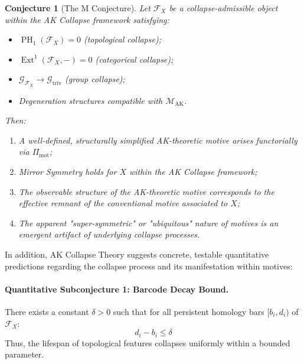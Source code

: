 \documentclass[11pt]{article}
\newtheorem{conjecture}{Conjecture}[section]
\DeclareMathOperator{\Ext}{Ext}
\DeclareMathOperator{\PH}{PH}
\begin{document}
\begin{conjecture}[The M Conjecture]
Let $\mathcal{F}_X$ be a collapse-admissible object within the AK Collapse framework satisfying:

\begin{itemize}
    \item $\PH_1(\mathcal{F}_X) = 0$ (topological collapse);
    \item $\Ext^1(\mathcal{F}_X, -) = 0$ (categorical collapse);
    \item $\mathcal{G}_{\mathcal{F}_X} \longrightarrow \mathcal{G}_{\mathrm{triv}}$ (group collapse);
    \item Degeneration structures compatible with $\mathcal{M}_{\mathrm{AK}}$.
\end{itemize}

Then:

\begin{enumerate}
    \item A well-defined, structurally simplified AK-theoretic motive arises functorially via $\Pi_{\mathrm{mot}}$;
    \item Mirror Symmetry holds for $X$ within the AK Collapse framework;
    \item The observable structure of the AK-theoretic motive corresponds to the effective remnant of the conventional motive associated to $X$;
    \item The apparent "super-symmetric" or "ubiquitous" nature of motives is an emergent artifact of underlying collapse processes.
\end{enumerate}
\end{conjecture}

\vspace{1em}

In addition, AK Collapse Theory suggests concrete, testable quantitative predictions regarding the collapse process and its manifestation within motives:

\paragraph{Quantitative Subconjecture 1: Barcode Decay Bound.}

There exists a constant $\delta > 0$ such that for all persistent homology bars $[b_i, d_i)$ of $\mathcal{F}_X$:
\begin{equation}
d_i - b_i \leq \delta
\end{equation}
Thus, the lifespan of topological features collapses uniformly within a bounded parameter.
\end{document}
